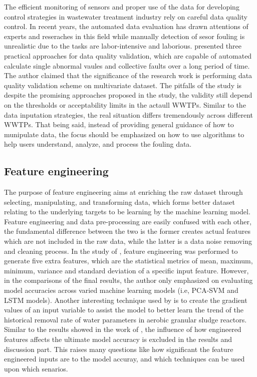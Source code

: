 The efficient monitoring of sensors and proper use of the data for developing control strategies in wastewater treatment industry rely on careful data quality control. In recent years, the automated data evaluation has drawn attentions of experts and reseraches in this field while manually detection of sesor fouling is unrealistic due to the tasks are labor-intensive and laborious. \citet{alferesValidatingDataQuality2013} presented three practical approaches for data quality validation, which are capable of automated calculate single abnormal vaules and collective faults over a long period of time. The author claimed that the significance of the research work is performing data quality validation scheme on multivariate dataset. The pitfalls of the study is despite the promising approaches proposed in the study, the validity still depend on the thresholds or acceptability limits in the actaull WWTPs. Similar to the data inputation strategies, the real situation differs tremendously across different WWTPs. That being said, instead of providing general guidance of how to munipulate data, the focus should be emphasized on how to use algorithms to help users understand, analyze, and process the fouling data.

\subsection{Feature engineering}
The purpose of feature engineering aims at enriching the raw dataset through selecting, manipulating, and transforming data, which forms better dataset relating to the underlying targets to be learning by the machine learning model. Feature engineering and data pre-processing are easily confused with each other, the fundamental difference between the two is the former creates actual features which are not included in the raw data, while the latter is a data noise removing and cleaning process. In the study of \citet{mamandipoorMonitoringDetectingFaults2020}, feature engineering was performed to generate five extra features, which are the statistical metrics of mean, maximum, minimum, variance and standard deviation of a specific input feature. However, in the comparisons of the final results, the author only emphasized on evaluating model accuracies across varied machine learning models (i.e, PCA-SVM and LSTM models). Another interesting technique used by \citet{zaghloulDevelopmentEnsembleMachine2021} is to create the gradient values of an input variable to assist the model to better learn the trend of the historical removal rate of water parameters in aerobic granular sludge reactors. Similar to the results showed in the work of \citet{mamandipoorMonitoringDetectingFaults2020}, the influence of how engineered features affects the ultimate model accuracy is excluded in the results and discussion part. This raises many questions like how significant the feature engineered inputs are to the model accuray, and which techniques can be used upon which senarios. 

